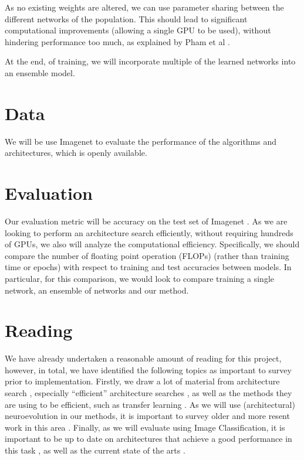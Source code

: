 \documentclass[10pt,letterpaper]{article}
\begin{document}
As no existing weights are altered, we can use parameter sharing between the different networks of the population. This should lead to significant computational improvements (allowing a single GPU to be used), without hindering performance too much, as explained by Pham et al \cite{eas2}.

At the end, of training, we will incorporate multiple of the learned networks into an ensemble model.


\section{Data}
We will be use Imagenet \cite{imagenet} to evaluate the performance of the algorithms and architectures, which is openly available. 


\section{Evaluation}
Our evaluation metric will be accuracy on the test set of Imagenet \cite{imagenet}. As we are looking to perform an architecture search efficiently, without requiring hundreds of GPUs, we also will analyze the computational efficiency. Specifically, we should compare the number of floating point operation (FLOPs) (rather than training time or epochs) with respect to training and test accuracies between models. In particular, for this comparison, we would look to compare training a single network, an ensemble of networks and our method.


\section{Reading}
We have already undertaken a reasonable amount of reading for this project, however, in total, we have identified the following topics as important to survey prior to implementation. Firstly, we draw a lot of material from architecture search \cite{as2, as1, as3}, especially ``efficient'' architecture searches \cite{eas1, eas2}, as well as the methods they are using to be efficient, such as transfer learning \cite{net2net, transfer1}. As we will use (architectural) neuroevolution in our methods, it is important to survey older and more resent work in this area \cite{ne3, as2, ne1, ne2, shimonsarl}. Finally, as we will evaluate using Image Classification, it is important to be up to date on architectures that achieve a good performance in this task \cite{densenet,inception3,resnet3}, as well as the current state of the arts \cite{classify3, classify4, classify2, resnet3, classify6, as1}. 



{\small


}
\end{document}
